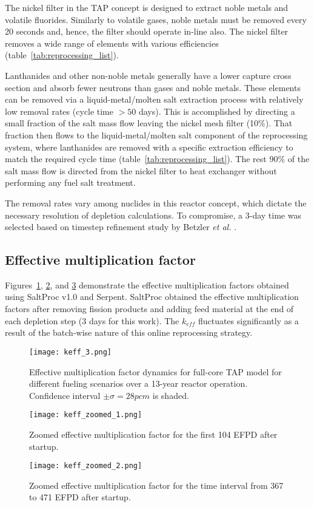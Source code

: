 The nickel filter in the \gls{TAP} concept is designed to extract noble metals 
and volatile fluorides. Similarly to volatile gases, noble metals must be 
removed every 20 seconds and, hence, the filter should operate in-line also. 
The nickel filter removes a wide range of elements with various efficiencies 
(table~\ref{tab:reprocessing_list}).

Lanthanides and other non-noble metals generally have a lower capture  
cross section and absorb fewer neutrons than gases and noble metals. These 
elements can be removed via a liquid-metal/molten salt extraction process with 
relatively low removal rates (cycle time $> 50$ days). This is accomplished 
by directing a small fraction of the salt mass flow leaving the nickel mesh 
filter (10\%). That fraction then flows to the liquid-metal/molten salt 
component of the reprocessing system, where lanthanides are removed with a 
specific extraction efficiency to match the  required cycle time 
(table~\ref{tab:reprocessing_list}). The rest 90\% of the salt mass flow is 
directed from the nickel filter to heat exchanger without performing any fuel 
salt treatment.

The removal rates vary among nuclides in this reactor concept, which dictate 
the necessary resolution of depletion calculations. To compromise, a 3-day 
time was selected based on timestep refinement study by Betzler \emph{et al.} 
\cite{betzler_assessment_2017}.
\subsection{Effective multiplication factor}
Figures~\ref{fig:keff}, \ref{fig:keff-zoomed}, and \ref{fig:keff-zoomed-2} 
demonstrate the effective multiplication factors obtained using SaltProc v1.0 
and Serpent. SaltProc obtained the effective multiplication factors after 
removing fission products and adding feed material at the end of each 
depletion step (3 days for this work). The $k_{eff}$ fluctuates significantly 
as a result of the batch-wise nature of this online reprocessing strategy.
\begin{figure}[htp!] %
	\texttt{[image: keff\_3.png]}
	\vspace{-0.2in}
	\caption{Effective multiplication factor dynamics for full-core
		\gls{TAP} model for different fueling scenarios over a 13-year reactor 
		operation. 
		Confidence interval $\pm\sigma=28pcm$ is shaded.}
	\label{fig:keff}
\end{figure}
\begin{figure}[htp!] %
	\centering
	\texttt{[image: keff\_zoomed\_1.png]}
	\caption{Zoomed effective multiplication factor for the first 104 EFPD 
		after startup.}
	\label{fig:keff-zoomed}
\end{figure}
\begin{figure}[htp!] %
	\centering
	\texttt{[image: keff\_zoomed\_2.png]}
	\caption{Zoomed effective multiplication factor for the time interval 
		from 367 to 471 EFPD after startup.}
	\label{fig:keff-zoomed-2}
\end{figure}

